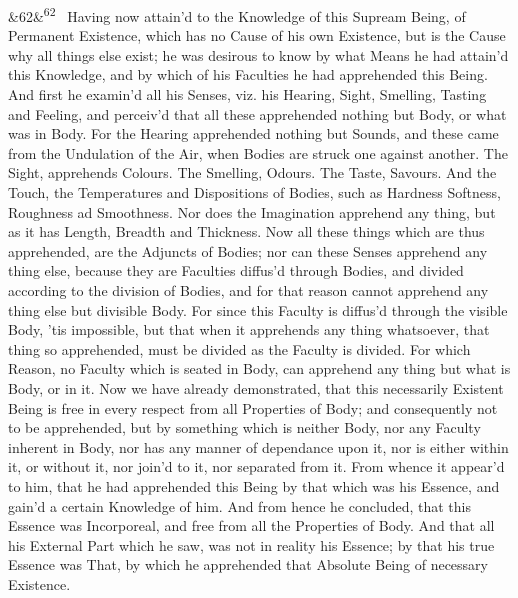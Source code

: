 \documentclass[12pt]{article}
\newcommand{\para}[1][]{\par\noindent\ifx&#1&\else\textsuperscript{\footnotesize #1}~\fi}
\begin{document}
\para[62] Having now attain'd to the Knowledge of this Supream Being, of Permanent Existence, which has no Cause of his own Existence, but is the Cause why all things else exist; he was desirous to know by what Means he had attain'd this Knowledge, and by which of his Faculties he had apprehended this Being. And first he examin'd all his Senses, viz. his Hearing, Sight, Smelling, Tasting and Feeling, and perceiv'd that all these apprehended nothing but Body, or what was in Body. For the Hearing apprehended nothing but Sounds, and these came from the Undulation of the Air, when Bodies are struck one against another. The Sight, apprehends Colours. The Smelling, Odours. The Taste, Savours. And the Touch, the Temperatures and Dispositions of Bodies, such as Hardness Softness, Roughness ad Smoothness. Nor does the Imagination apprehend any thing, but as it has Length, Breadth and Thickness. Now all these things which are thus apprehended, are the Adjuncts of Bodies; nor can these Senses apprehend any thing else, because they are Faculties diffus'd through Bodies, and divided according to the division of Bodies, and for that reason cannot apprehend any thing else but divisible Body. For since this Faculty is diffus'd through the visible Body, 'tis impossible, but that when it apprehends any thing whatsoever, that thing so apprehended, must be divided as the Faculty is divided. For which Reason, no Faculty which is seated in Body, can apprehend any thing but what is Body, or in it. Now we have already demonstrated, that this necessarily Existent Being is free in every respect from all Properties of Body; and consequently not to be apprehended, but by something which is neither Body, nor any Faculty inherent in Body, nor has any manner of dependance upon it, nor is either within it, or without it, nor join'd to it, nor separated from it. From whence it appear'd to him, that he had apprehended this Being by that which was his Essence, and gain'd a certain Knowledge of him. And from hence he concluded, that this Essence was Incorporeal, and free from all the Properties of Body. And that all his External Part which he saw, was not in reality his Essence; by that his true Essence was That, by which he apprehended that Absolute Being of necessary Existence.
\end{document}
